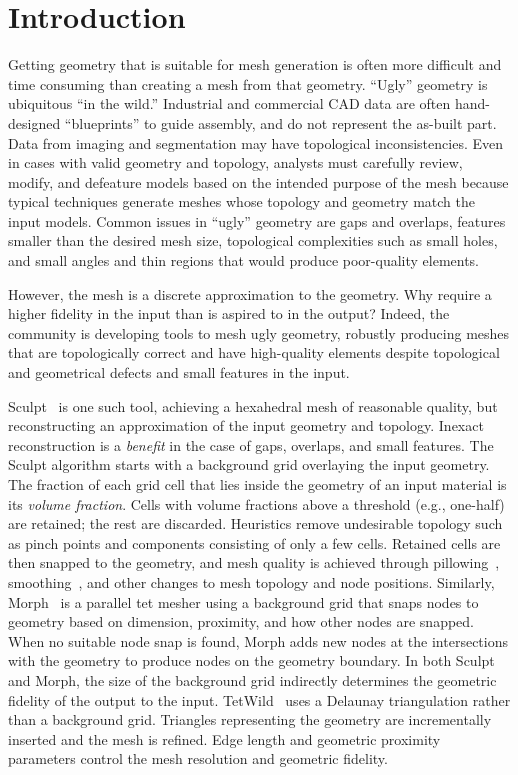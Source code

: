 \section{Introduction}
Getting geometry that is suitable for mesh generation is often more difficult and time consuming than creating a mesh from that geometry.
``Ugly'' geometry is ubiquitous ``in the wild.'' 
Industrial and commercial CAD data are often hand-designed ``blueprints'' to guide assembly, and do not represent the as-built part. 
Data from imaging and segmentation may have topological inconsistencies.
Even in cases with valid geometry and topology, analysts must carefully review, modify, and defeature models based on the intended purpose of the mesh because typical techniques  generate meshes whose topology and geometry match the input models.
Common issues in ``ugly'' geometry are gaps and overlaps,  features smaller than the desired mesh size, topological complexities such as small holes, and small angles and thin regions that would produce poor-quality elements.

However, the mesh is a discrete approximation to the geometry. Why require a higher fidelity in the input than is aspired to in the output?  Indeed, the community is developing tools to mesh ugly geometry, robustly producing meshes that are topologically correct and have high-quality elements despite topological and geometrical defects and small features in the input.

Sculpt~\cite{owen2012parallel,owen2015evaluation,sculpt} is one such tool, achieving a hexahedral mesh of reasonable quality, but reconstructing an approximation of the input geometry and topology.
Inexact reconstruction is a \emph{benefit} in the case of gaps, overlaps, and small features. 
The Sculpt algorithm starts with a background grid overlaying the input geometry. 
The fraction of each grid cell that lies inside the geometry of an input material is its \emph{volume fraction}.
Cells with volume fractions above a threshold (e.g., one-half) are retained; the rest are discarded. 
Heuristics remove undesirable  topology such as pinch points and components consisting of only a few cells. Retained cells are then snapped to the geometry, and mesh quality is achieved through pillowing~\cite{mitchel1995pillowing,10.1007/978-3-540-87921-3_28,ZHANG2010405}, smoothing~\cite{Knupp:2012:TMOP}, and other changes to mesh topology and node positions.
%
Similarly, Morph~\cite{morph_noble_2,morph_staten_1} is a parallel tet mesher using a background grid that snaps nodes to geometry based on dimension, proximity, and how other nodes are snapped.
When no suitable node snap is found, Morph adds new nodes at the intersections with the geometry to produce nodes on the geometry boundary. 
In both Sculpt and Morph, the size of the background grid indirectly determines the geometric fidelity of the output to the input.
TetWild~\cite{10.1145/3386569.3392385,10.1145/3197517.3201353} uses a Delaunay triangulation rather than a background grid. Triangles representing the geometry are incrementally inserted and the mesh is refined. Edge length and geometric proximity parameters control the mesh resolution and geometric fidelity.


